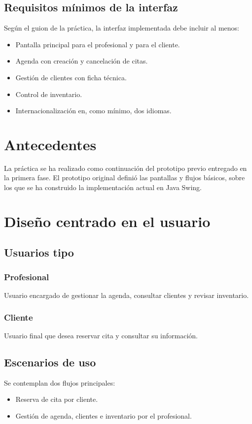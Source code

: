 \documentclass[12pt,a4paper]{report}
\begin{document}
\section{Requisitos mínimos de la interfaz}
Según el guion de la práctica, la interfaz implementada debe incluir al menos:
\begin{itemize}
    \item Pantalla principal para el profesional y para el cliente.
    \item Agenda con creación y cancelación de citas.
    \item Gestión de clientes con ficha técnica.
    \item Control de inventario.
    \item Internacionalización en, como mínimo, dos idiomas.
\end{itemize}

\chapter{Antecedentes}
La práctica se ha realizado como continuación del prototipo previo entregado en la primera fase. El prototipo original definió las pantallas y flujos básicos, sobre los que se ha construido la implementación actual en Java Swing.

\chapter{Diseño centrado en el usuario}
\section{Usuarios tipo}
\subsection{Profesional}
Usuario encargado de gestionar la agenda, consultar clientes y revisar inventario.

\subsection{Cliente}
Usuario final que desea reservar cita y consultar su información.

\section{Escenarios de uso}
Se contemplan dos flujos principales:
\begin{itemize}
    \item Reserva de cita por cliente.
    \item Gestión de agenda, clientes e inventario por el profesional.
\end{itemize}
\end{document}
